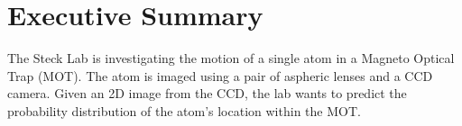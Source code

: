 \section*{Executive Summary}

The Steck Lab is investigating the motion of a single atom in a Magneto Optical Trap (MOT).  The atom is imaged using a pair of aspheric lenses and a CCD camera.  Given an 2D image from the CCD, the lab wants to predict the probability distribution of the atom's location within the MOT.






